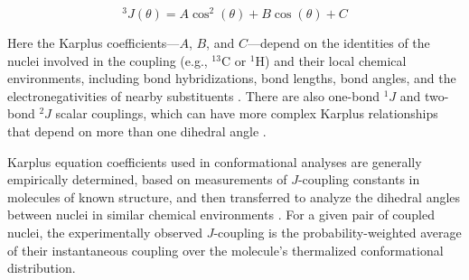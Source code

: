 \documentclass[9pt,review,pubversion]{livecoms}
\begin{document}
\begin{equation}
\label{eqn:karplus}
^3J(\theta) = A \cos^2 (\theta) + B \cos (\theta) + C
\end{equation}

\noindent Here the Karplus coefficients---$A$, $B$, and $C$---depend on the identities of the nuclei involved in the coupling  (e.g., $^{13}$C or $^1$H) and their local chemical environments, including bond hybridizations, bond lengths, bond angles, and the electronegativities of nearby substituents \cite{haasnoot_relationship_1980}.
There are also one-bond $^1J$ and two-bond $^2J$ scalar couplings, which can have more complex Karplus relationships that depend on more than one dihedral angle \cite{vuister_use_1993,cornilescu_large_2000,wirmer_angular_2002,ding_protein_2004,gapsys_improved_2015}.

Karplus equation coefficients used in conformational analyses are generally empirically determined, based on measurements of $J$-coupling constants in molecules of known structure, and then transferred to analyze the dihedral angles between nuclei in similar chemical environments \cite{karplus_contact_1959,karplus_vicinal_1963,haasnoot_relationship_1980,wang_determination_1996,vogeli_limits_2007}.
For a given pair of coupled nuclei, the experimentally observed $J$-coupling is the probability-weighted average of their instantaneous coupling over the molecule’s thermalized conformational distribution.
\end{document}
